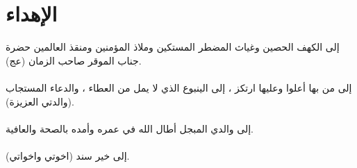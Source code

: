 \chapter*{الإهداء}
إلى الكهف الحصين وغياث المضطر المستكين وملاذ المؤمنين ومنقذ العالمين حضرة جناب الموقر صاحب الزمان (عج).\\
\\
إلى من بها أعلوا وعليها ارتكز ، إلى الينبوع الذي لا يمل من العطاء ، والدعاء المستجاب (والدتي العزيزة).\\
\\
إلى والدي المبجل أطال الله في عمره وأمده بالصحة والعافية.\\
\\
إلى خير سند (اخوتي واخواتي).

